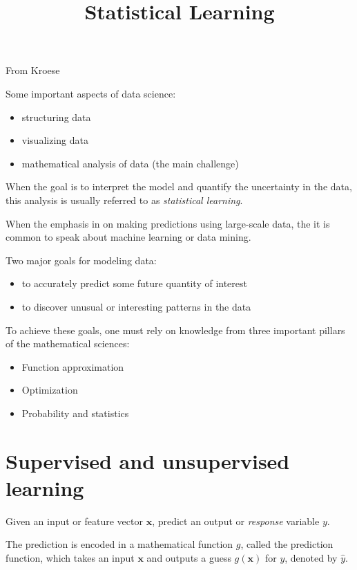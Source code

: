 



\title{Statistical Learning}
\date{}
\maketitle

From Kroese

Some important aspects of data science:
\begin{itemize}
\item structuring data
\item visualizing data
\item mathematical analysis of data (the main challenge)
\end{itemize}

When the goal is to interpret the model and quantify the uncertainty in the data,
this analysis is usually referred to as \emph{statistical learning}.

When the emphasis in on making predictions using large-scale data, the it is common
to speak about machine learning or data mining.

Two major goals for modeling data:
\begin{itemize}
\item to accurately predict some future quantity of interest
\item to discover unusual or interesting patterns in the data
\end{itemize}

To achieve these goals, one must rely on knowledge from three important pillars
of the mathematical sciences:
\begin{itemize}
\item Function approximation
\item Optimization
\item Probability and statistics
\end{itemize}


\section{Supervised and unsupervised learning}

Given an input or feature vector $\mathbf{x}$, predict an output or \emph{response} variable $y$.

The prediction is encoded in a mathematical function $g$, called the prediction function,
which takes an input $\mathbf{x}$ and outputs a guess $g(\mathbf{x})$ for $y$, denoted by
$\widehat{y}$.




